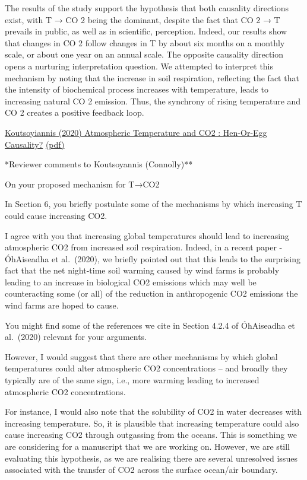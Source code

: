 \documentclass[
]{book}
\begin{document}
The results of the study support the hypothesis that both causality directions exist, with T → CO 2
being the dominant, despite the fact that CO 2 → T prevails in public, as well as in scientific, perception.
Indeed, our results show that changes in CO 2 follow changes in T by about six months on a monthly
scale, or about one year on an annual scale.
The opposite causality direction opens a nurturing interpretation question. We attempted to
interpret this mechanism by noting that the increase in soil respiration, reflecting the fact that the
intensity of biochemical process increases with temperature, leads to increasing natural CO 2 emission.
Thus, the synchrony of rising temperature and CO 2 creates a positive feedback loop.

\href{https://www.mdpi.com/2413-4155/2/4/83}{Koutsoyiannis (2020) Atmospheric Temperature and CO2 : Hen-Or-Egg Causality?}
\href{pdf/Koutsoyiannis_2020_Hen-Or-Egg_Causality.pdf}{(pdf)}

*Reviewer comments to Koutsoyannis (Connolly)**

On your proposed mechanism for T→CO2

In Section 6, you briefly postulate some of the mechanisms by which increasing T could cause increasing CO2.

I agree with you that increasing global temperatures should lead to increasing atmospheric CO2 from increased soil respiration. Indeed, in a recent paper - ÓhAiseadha et al.~(2020), we briefly pointed out that this leads to the surprising fact that the net night-time soil warming caused by wind farms is probably leading to an increase in biological CO2 emissions which may well be counteracting some (or all) of the reduction in anthropogenic CO2 emissions the wind farms are hoped to cause.

You might find some of the references we cite in Section 4.2.4 of ÓhAiseadha et al.~(2020) relevant for your arguments.

However, I would suggest that there are other mechanisms by which global temperatures could alter atmospheric CO2 concentrations -- and broadly they typically are of the same sign, i.e., more warming leading to increased atmospheric CO2 concentrations.

For instance, I would also note that the solubility of CO2 in water decreases with increasing temperature. So, it is plausible that increasing temperature could also cause increasing CO2 through outgassing from the oceans. This is something we are considering for a manuscript that we are working on. However, we are still evaluating this hypothesis, as we are realising there are several unresolved issues associated with the transfer of CO2 across the surface ocean/air boundary.
\end{document}
